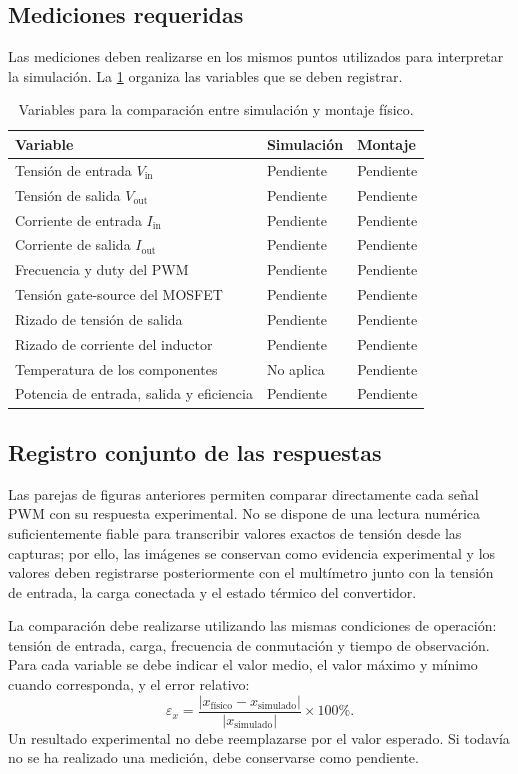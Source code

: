 \documentclass[12pt]{article}
\begin{document}
\subsection{Mediciones requeridas}
Las mediciones deben realizarse en los mismos puntos utilizados para interpretar la simulación. La \cref{tab:mediciones} organiza las variables que se deben registrar.
\begin{table}[H]
\centering
\caption{Variables para la comparación entre simulación y montaje físico.}
\label{tab:mediciones}
\begin{tabular}{p{5.2cm}p{3.4cm}p{3.4cm}}
\toprule
\textbf{Variable} & \textbf{Simulación} & \textbf{Montaje}\\
\midrule
Tensión de entrada $V_{\mathrm{in}}$ & Pendiente & Pendiente\\
Tensión de salida $V_{\mathrm{out}}$ & Pendiente & Pendiente\\
Corriente de entrada $I_{\mathrm{in}}$ & Pendiente & Pendiente\\
Corriente de salida $I_{\mathrm{out}}$ & Pendiente & Pendiente\\
Frecuencia y duty del PWM & Pendiente & Pendiente\\
Tensión gate-source del MOSFET & Pendiente & Pendiente\\
Rizado de tensión de salida & Pendiente & Pendiente\\
Rizado de corriente del inductor & Pendiente & Pendiente\\
Temperatura de los componentes & No aplica & Pendiente\\
Potencia de entrada, salida y eficiencia & Pendiente & Pendiente\\
\bottomrule
\end{tabular}
\end{table}

\subsection{Registro conjunto de las respuestas}
Las parejas de figuras anteriores permiten comparar directamente cada señal PWM con su respuesta experimental. No se dispone de una lectura numérica suficientemente fiable para transcribir valores exactos de tensión desde las capturas; por ello, las imágenes se conservan como evidencia experimental y los valores deben registrarse posteriormente con el multímetro junto con la tensión de entrada, la carga conectada y el estado térmico del convertidor.

La comparación debe realizarse utilizando las mismas condiciones de operación: tensión de entrada, carga, frecuencia de conmutación y tiempo de observación. Para cada variable se debe indicar el valor medio, el valor máximo y mínimo cuando corresponda, y el error relativo:
\begin{equation}
\varepsilon_x=\frac{|x_{\mathrm{físico}}-x_{\mathrm{simulado}}|}{|x_{\mathrm{simulado}}|}\times100\%.
\label{eq:error_comparacion}
\end{equation}
Un resultado experimental no debe reemplazarse por el valor esperado. Si todavía no se ha realizado una medición, debe conservarse como pendiente.
\end{document}
